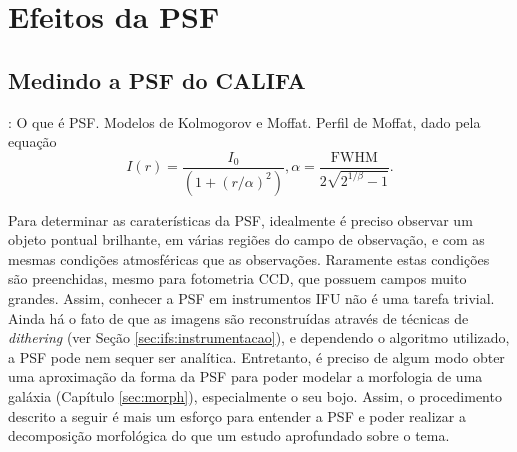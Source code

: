 


\chapter{Efeitos da PSF}
\label{sec:psf}


\section{Medindo a PSF do CALIFA}

\TODO: O que é PSF. Modelos de Kolmogorov e Moffat.
Perfil de Moffat, dado pela equação
$$
I(r) = \frac{I_0}{\left(1 + (r / \alpha)^2\right)},
\alpha = \frac{\mathrm{FWHM}}{2\sqrt{2^{1/\beta} - 1}}.
$$

Para determinar as caraterísticas da PSF, idealmente é preciso observar um
objeto pontual brilhante, em várias regiões do campo de observação, e com as
mesmas condições atmosféricas que as observações. Raramente estas condições são
preenchidas, mesmo para fotometria CCD, que possuem campos muito grandes. Assim,
conhecer a PSF em instrumentos IFU não é uma tarefa trivial. Ainda há o fato de
que as imagens são reconstruídas através de técnicas de {\em dithering} (ver
Seção \ref{sec:ifs:instrumentacao}), e dependendo o algoritmo utilizado, a PSF
pode nem sequer ser analítica. Entretanto, é preciso de algum modo obter uma
aproximação da forma da PSF para poder modelar a morfologia de uma galáxia
(Capítulo \ref{sec:morph}), especialmente o seu bojo. Assim, o procedimento
descrito a seguir é mais um esforço para entender a PSF e poder realizar a
decomposição morfológica do que um estudo aprofundado sobre o tema.

